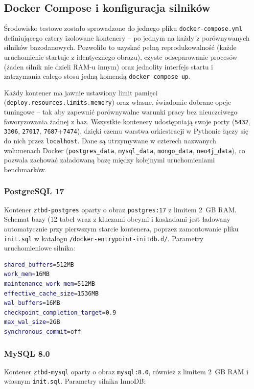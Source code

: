 \subsection{Docker Compose i konfiguracja silników}

Środowisko testowe zostało sprowadzone do jednego pliku \texttt{docker-compose.yml}
definiującego cztery izolowane kontenery -- po jednym na każdy z porównywanych silników
bazodanowych. Pozwoliło to uzyskać pełną reprodukowalność (każde uruchomienie
startuje z identycznego obrazu), czyste odseparowanie procesów (żaden silnik nie
dzieli RAM-u innym) oraz jednolity interfejs startu i zatrzymania
całego stosu jedną komendą \texttt{docker compose up}.

Każdy kontener ma jawnie ustawiony limit pamięci (\texttt{deploy.resources.limits.memory})
oraz własne, świadomie dobrane opcje tuningowe -- tak aby zapewnić porównywalne
warunki pracy bez nieuczciwego faworyzowania żadnej z baz.
Wszystkie kontenery udostępniają swoje porty
(\texttt{5432}, \texttt{3306}, \texttt{27017}, \texttt{7687}+\texttt{7474}),
dzięki czemu warstwa orkiestracji w Pythonie łączy się do nich przez \texttt{localhost}.
Dane są utrzymywane  w czterech nazwanych wolumenach Docker (\texttt{postgres\_data},
\texttt{mysql\_data}, \texttt{mongo\_data}, \texttt{neo4j\_data}), co pozwala zachować
załadowaną bazę między kolejnymi uruchomieniami benchmarków.

\subsubsection*{PostgreSQL 17}

Kontener \texttt{ztbd-postgres} oparty o obraz \texttt{postgres:17} z limitem 2~GB
RAM. Schemat bazy (12 tabel wraz z kluczami obcymi i kaskadami jest ładowany automatycznie przy pierwszym starcie
kontenera, poprzez zamontowanie pliku \texttt{init.sql} w katalogu
\texttt{/docker-entrypoint-initdb.d/}. Parametry uruchomieniowe silnika:

\begin{lstlisting}[language=bash,basicstyle=\ttfamily\small]
shared_buffers=512MB
work_mem=16MB
maintenance_work_mem=512MB
effective_cache_size=1536MB
wal_buffers=16MB
checkpoint_completion_target=0.9
max_wal_size=2GB
synchronous_commit=off
\end{lstlisting}

\subsubsection*{MySQL 8.0}
Kontener \texttt{ztbd-mysql} oparty o obraz \texttt{mysql:8.0}, również z limitem
2~GB RAM i własnym \texttt{init.sql}. Parametry silnika InnoDB:

